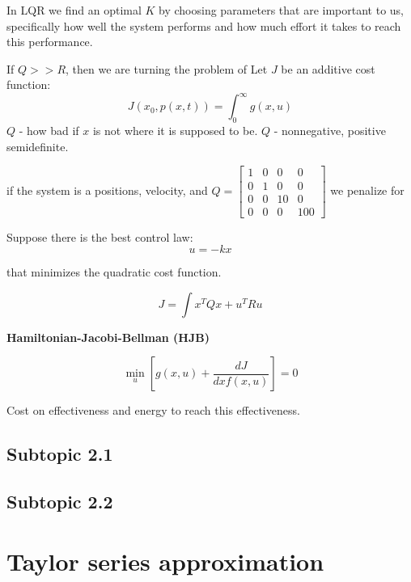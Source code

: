 In LQR we find an optimal \(K\) by choosing parameters that are important to us, specifically how well the system performs and how much effort it takes to reach this performance.

If \(Q>>R\), then we are turning the problem of 
Let \(J\) be an additive cost function:
\[J(x_0, p(x, t)) = \int_{0}^{\infty} g(x, u)\]
\(Q\) - how bad if \(x\) is not where it is supposed to be.
\(Q\) - nonnegative, positive semidefinite.

if the system is a positions, velocity, and \(Q = \begin{bmatrix} 1 & 0 & 0 & 0 \\ 0 & 1 & 0 & 0 \\ 0 & 0 & 10 & 0 \\ 0 & 0 & 0 & 100 \end{bmatrix}\) we penalize for 

Suppose there is the best control law:
\[u = -kx\]

that minimizes the quadratic cost function.

\[J = \int x^T Q x + u^T R u\]

\textbf{Hamiltonian-Jacobi-Bellman (HJB)}

\[\min_u [g(x, u) + \frac{dJ}{dx f(x, u)}] = 0\]

Cost on effectiveness and energy to reach this effectiveness.

\subsection{Subtopic 2.1}

\subsection{Subtopic 2.2}



\section{Taylor series approximation}



